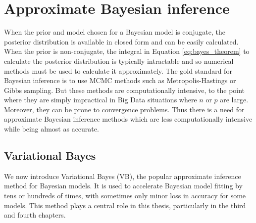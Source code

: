 

\section{Approximate Bayesian inference}

When the prior and model chosen for a Bayesian model is conjugate, the
posterior distribution is available in closed form and can be easily
calculated.  When the prior is non-conjugate, the integral in Equation
\ref{eq:bayes_theorem} to calculate the posterior distribution  is typically
intractable and so numerical methods must be used to calculate it
approximately.  The gold standard for Bayesian inference is to use MCMC methods
such as Metropolis-Hastings or Gibbs sampling.  But these methods are
computationally intensive, to the point where they are simply impractical in
Big Data situations where $n$ or $p$ are large. Moreover, they can be prone to
convergence problems.  Thus there is a need for approximate Bayesian inference
methods which are less computationally intensive while being almost as
accurate.

 
\subsection{Variational Bayes}
\label{sec:vb}

We now introduce Variational Bayes (VB), the popular approximate inference method for
Bayesian models. It is used to accelerate Bayesian model fitting by tens or
hundreds of times, with sometimes only minor loss in accuracy for some models.
This method plays a central role in this thesis, particularly in the third and
fourth chapters.


